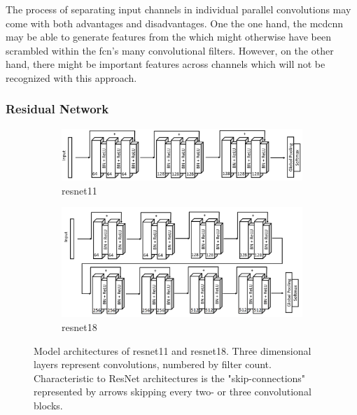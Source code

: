 The process of separating input channels in individual parallel convolutions may come with both advantages and disadvantages. One the one hand, the \acrshort{mcdcnn} may be able to generate features from the which might otherwise have been scrambled within the \acrshort{fcn}'s many convolutional filters. However, on the other hand, there might be important features across channels which will not be recognized with this approach. 

\newpage
\subsubsection{Residual Network}

\begin{figure}[h]
    \begin{subfigure}[b]{\textwidth}
        \includegraphics[width=\textwidth]{figures/impl_ResNet11.png}
        \caption{\acrfull{resnet11}}
        \label{fig:impl_ResNet11}
    \end{subfigure}
    \begin{subfigure}[b]{\textwidth}
        \includegraphics[width=\textwidth]{figures/impl_ResNet18.png}
        \caption{\acrfull{resnet18}}
        \label{fig:impl_ResNet18}
    \end{subfigure}
    \caption{Model architectures of \acrshort{resnet11} and \acrshort{resnet18}. Three dimensional layers represent convolutions, numbered by filter count. Characteristic to ResNet architectures is the "skip-connections" represented by arrows skipping every two- or three convolutional blocks.}
\end{figure}

